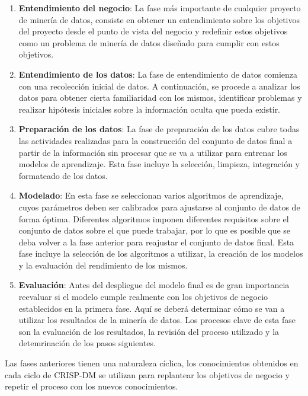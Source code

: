 \begin{enumerate}
    \item \textbf{Entendimiento del negocio}: La fase más importante de
    cualquier proyecto de minería de datos, consiste en obtener un entendimiento
    sobre los objetivos del proyecto desde el punto de vista del negocio y
    redefinir estos objetivos como un problema de minería de datos diseñado para
    cumplir con estos objetivos.
    \item \textbf{Entendimiento de los datos}: La fase de entendimiento de datos
    comienza con una recolección inicial de datos. A continuación, se procede a
    analizar los datos para obtener cierta familiaridad con los mismos,
    identificar problemas y realizar hipótesis iniciales sobre la información
    oculta que pueda existir.
    \item \textbf{Preparación de los datos}: La fase de preparación de los datos
    cubre todas las actividades realizadas para la construcción del conjunto de
    datos final a partir de la información sin procesar que se va a utilizar
    para entrenar los modelos de aprendizaje. Esta fase incluye la selección,
    limpieza, integración y formateado de los datos.
    \item \textbf{Modelado}: En esta fase se seleccionan varios algoritmos de
    aprendizaje, cuyos parámetros deben ser calibrados para ajustarse al
    conjunto de datos de forma óptima. Diferentes algoritmos imponen diferentes
    requisitos sobre el conjunto de datos sobre el que puede trabajar, por lo
    que es posible que se deba volver a la fase anterior para reajustar el
    conjunto de datos final. Esta fase incluye la selección de los algoritmos a
    utilizar, la creación de los modelos y la evaluación del rendimiento de los
    mismos.
    \item \textbf{Evaluación}: Antes del despliegue del modelo final es de gran
    importancia reevaluar si el modelo cumple realmente con los objetivos de
    negocio establecidos en la primera fase. Aquí se deberá determinar cómo se
    van a utilizar los resultados de la minería de datos. Los procesos clave de
    esta fase son la evaluación de los resultados, la revisión del proceso
    utilizado y la detemrinación de los pasos siguientes.
\end{enumerate}

Las fases anteriores tienen una naturaleza cíclica, los conocimientos obtenidos
en cada ciclo de CRISP-DM se utilizan para replantear los objetivos de negocio y
repetir el proceso con los nuevos conocimientos.

